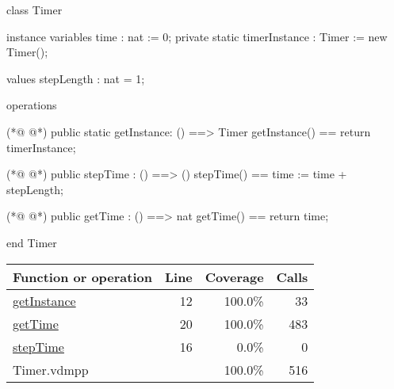 \begin{vdmpp}[breaklines=true]
class Timer

instance variables
 time : nat := 0;
 private static timerInstance : Timer := new Timer(); 

values
 stepLength : nat = 1;

operations

(*@
\label{getInstance:12}
@*)
public static getInstance: () ==> Timer
getInstance() ==
  return timerInstance;

(*@
\label{stepTime:16}
@*)
public stepTime : () ==> ()
stepTime() ==
  time := time + stepLength;

(*@
\label{getTime:20}
@*)
public getTime : () ==> nat
getTime() ==
  return time;

end Timer
\end{vdmpp}
\bigskip
\begin{longtable}{|l|r|r|r|}
\hline
Function or operation & Line & Coverage & Calls \\
\hline
\hline
\hyperref[getInstance:12]{getInstance} & 12&100.0\% & 33 \\
\hline
\hyperref[getTime:20]{getTime} & 20&100.0\% & 483 \\
\hline
\hyperref[stepTime:16]{stepTime} & 16&0.0\% & 0 \\
\hline
\hline
Timer.vdmpp & & 100.0\% & 516 \\
\hline
\end{longtable}

